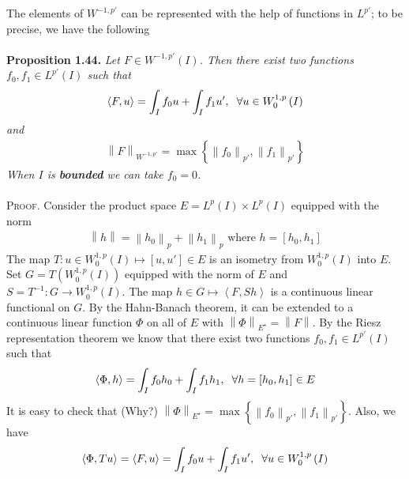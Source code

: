 \documentclass[a4paper,oneside]{book}
\numberwithin{equation}{chapter}
\begin{document}
The elements of $W^{-1,p'}$ can be represented with the help of functions in $L^{p'}$; to be precise, we have the following\\
\\
\textbf{Proposition 1.44.} \textit{Let $F\in W^{-1,p'}\left(I\right)$. Then there exist two functions $f_0,f_1\in L^{p'}\left(I\right)$ such that}
\begin{align}
\left\langle {F,u} \right\rangle  = \int_I {{f_0}u}  + \int_I {{f_1}u'} ,\hspace{0.2cm}\forall u \in W_0^{1,p}\left( I \right)
\end{align}
\textit{and}
\begin{align}
{\left\| F \right\|_{{W^{ - 1,p'}}}} = \max \left\{ {{{\left\| {{f_0}} \right\|}_{p'}},{{\left\| {{f_1}} \right\|}_{p'}}} \right\}
\end{align}
\textit{When $I$ is \textbf{bounded} we can take $f_0=0$.}\\
\\
\textsc{Proof.} Consider the product space $E=L^p\left(I\right)\times L^p\left(I\right)$ equipped with the norm
\begin{align}
\left\| h \right\| = {\left\| {{h_0}} \right\|_p} + {\left\| {{h_1}} \right\|_p}\mbox{ where } h = \left[ {{h_0},{h_1}} \right]
\end{align}
The map $T:u \in W_0^{1,p}\left( I \right) \mapsto \left[ {u,u'} \right] \in E$ is an isometry from $W_0^{1,p}\left(I\right)$ into $E$. Set $G = T\left( {W_0^{1,p}\left( I \right)} \right)$ equipped with the norm of $E$ and $S = {T^{ - 1}}:G \to W_0^{1,p}\left( I \right)$. The map $h \in G \mapsto \left\langle {F,Sh} \right\rangle $ is a continuous linear functional on $G$. By the Hahn-Banach theorem, it can be extended to a continuous linear function $\Phi $ on all of $E$ with ${\left\| \Phi  \right\|_{{E^{\star}}}} = \left\| F \right\|$. By the Riesz representation theorem we know that there exist two functions $f_0,f_1\in L^{p'}\left(I\right)$ such that
\begin{align}
\left\langle {\Phi ,h} \right\rangle  = \int_I {{f_0}{h_0}}  + \int_I {{f_1}{h_1}} ,\hspace{0.2cm}\forall h = \left[ {{h_0},{h_1}} \right] \in E
\end{align}
It is easy to check that (Why?) ${\left\| \Phi  \right\|_{{E^{\star}}}} = \max \left\{ {{{\left\| {{f_0}} \right\|}_{p'}},{{\left\| {{f_1}} \right\|}_{p'}}} \right\}$. Also, we have
\begin{align}
\left\langle {\Phi ,Tu} \right\rangle  = \left\langle {F,u} \right\rangle  = \int_I {{f_0}u}  + \int_I {{f_1}u'} ,\hspace{0.2cm}\forall u \in W_0^{1,p}\left( I \right)
\end{align}
\end{document}
